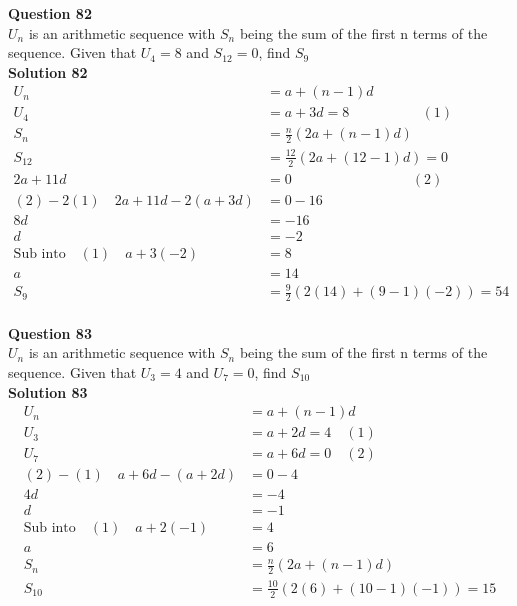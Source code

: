 \documentclass{article}
\begin{document}
\noindent\textbf{Question 82}\\[5pt]
$U_n$ is an arithmetic sequence with $S_n$ being the sum of the first n terms of the sequence. Given that $U_{4}=8$ and $S_{12}=0$, find $S_{9}$\\[5pt]
\noindent\textbf{Solution 82}\\[5pt]
\begin{align*}
U_n&=a+(n-1)d\\[2pt]
U_4&=a+3d=8 \hspace{62pt} (1)\\[2pt]
S_n&=\displaystyle\frac{n}{2}(2a+(n-1)d)\\[2pt]
S_{12}&=\displaystyle\frac{12}{2}(2a+(12-1)d)=0\\[2pt]
2a+11d&=0\hspace{103pt} (2)\\[2pt]
(2)-2(1) \quad 2a+11d-2(a+3d)&=0-16\\[2pt]
8d&=-16\\[2pt]
d&=-2\\[2pt]
\text{Sub into}\quad (1) \quad a+3(-2)&=8\\[2pt]
a&=14\\[12pt]
S_9&=\displaystyle\frac{9}{2}(2(14)+(9-1)(-2))=54
\end{align*}\\[10pt]

\noindent\textbf{Question 83}\\[5pt]
$U_n$ is an arithmetic sequence with $S_n$ being the sum of the first n terms of the sequence. Given that $U_{3}=4$ and $U_{7}=0$, find $S_{10}$\\[5pt]
\noindent\textbf{Solution 83}\\[5pt]
\begin{align*}
U_n&=a+(n-1)d\\[2pt]
U_3&=a+2d=4 \quad (1)\\[2pt]
U_7&=a+6d=0 \quad (2)\\[2pt]
(2)-(1) \quad a+6d-(a+2d)&=0-4\\[2pt]
4d&=-4\\[2pt]
d&=-1\\[2pt]
\text{Sub into}\quad (1) \quad a+2(-1)&=4\\[2pt]
a&=6\\[12pt]
S_n&=\displaystyle\frac{n}{2}(2a+(n-1)d)\\[2pt]
S_{10}&=\displaystyle\frac{10}{2}(2(6)+(10-1)(-1))=15
\end{align*}\\[10pt]
\end{document}

